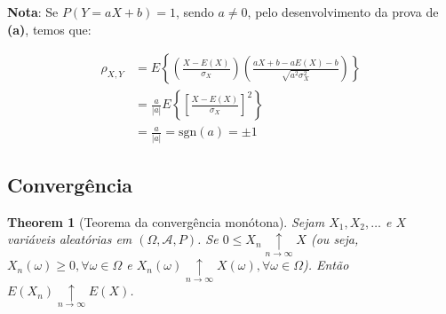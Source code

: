 \documentclass[
]{article}
\newtheorem{theorem}{Theorem}[section]
\theoremstyle{definition}
\theoremstyle{definition}
\theoremstyle{definition}
\theoremstyle{definition}
\theoremstyle{remark}
\begin{document}
\textbf{Nota}: Se \(P(Y = aX + b) = 1\), sendo \(a \neq 0\), pelo desenvolvimento da prova de \textbf{(a)}, temos que:

\begin{align*}
\rho_{X,Y} &= E\left\{\left(\frac{X - E(X)}{\sigma_{X}}\right)\left(\frac{aX + b - aE(X) - b}{\sqrt{a^{2}\sigma_{X}^{2}}}\right)\right\} \\
&= \frac{a}{|a|}E\left\{\left[\frac{X - E(X)}{\sigma_{X}}\right]^{2}\right\} \\
&= \frac{a}{|a|} = \mathrm{sgn}(a) = \pm 1
\end{align*}

\hypertarget{converguxeancia}{%
\subsection{Convergência}\label{converguxeancia}}

\begin{theorem}[Teorema da convergência monótona]
Sejam \(X_{1},X_{2},\ldots\) e \(X\) variáveis aleatórias em \((\Omega,\mathcal{A},P)\). Se \(0 \le X_{n} \underset{n \to \infty}{\uparrow}X\) (ou seja, \(X_{n}(\omega) \ge 0 ,\forall \omega \in \Omega\) e \(X_{n}(\omega)\underset{n \to \infty}{\uparrow}X(\omega),\forall \omega \in \Omega\)). Então \(E(X_{n}) \underset{n \to \infty}{\uparrow} E(X)\).
\end{theorem}
\end{document}
